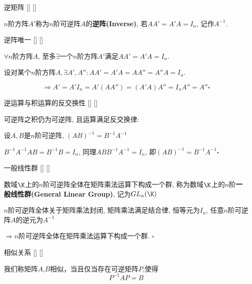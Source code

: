 \documentclass[UTF8]{ctexart}
\begin{document}
		\begin{dfn}
			[]
			{逆矩阵}
			[]
			[]

			$n$阶方阵$A'$称为$n$阶可逆阵$A$的\textbf{逆阵(Inverse)}, 若$AA'=A'A=I_n$, 记作$A^{-1}$. 
		\end{dfn}
		
		\begin{ppt}
			[]
			{逆阵唯一}
			[]
			[]
		
			$\forall n$阶方阵$A$, 至多$\exists$一个$n$阶方阵$A'$满足$AA'=A'A=I_n$. 
		\end{ppt}

        \begin{prf}
			设对某个$n$阶方阵$A, \exists A',A'': AA'=A'A=AA''=A''A=I_n$. 
			
			$$\Longrightarrow A'=A'I_n=A'(AA'')=(A'A)A''=I_nA''=A''\square$$
	    \end{prf}
 
		\begin{ppt}
			[]
			{逆运算与积运算的反交换性}
			[]
			[]

			可逆阵之积仍为可逆阵, 且运算满足反交换律: 
			
			设$A,B$是$n$阶可逆阵, $(AB)^{-1}=B^{-1}A^{-1}$
		\end{ppt}
  
		\begin{prf}
            $B^{-1}A^{-1}AB=B^{-1}B=I_n$, 同理$ABB^{-1}A^{-1}=I_n$, 即$(AB)^{-1}=B^{-1}A^{-1}\square$
		\end{prf}
		
		
		\begin{ppt}
			[]
			{一般线性群}
			[]
			[]

			数域$\K$上的$n$阶可逆阵全体在矩阵乘法运算下构成一个群, 称为数域$\K$上的$n$阶\textbf{一般线性群(General Linear Group)}, 记为$GL_n(\K)$
		\end{ppt}
  
		\begin{prf}
			 $n$阶可逆阵全体关于矩阵乘法封闭, 矩阵乘法满足结合律, 恒等元为$I_n$, 任意$n$阶可逆阵$A$的逆元为$A^{-1}$
			
			$\Longrightarrow n$阶可逆阵全体在矩阵乘法运算下构成一个群. $\square$
        \end{prf}
        
		\begin{dfn}
			[]
			{相似关系}
			[]
			[]
  
            我们称矩阵$A$,$B$相似，当且仅当存在可逆矩阵$P$,使得
            \[P^{-1}AP=B\]

		\end{dfn}
		
\end{document}
